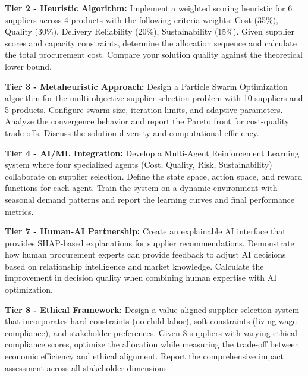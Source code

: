 \documentclass{article}
\begin{document}
\textbf{Tier 2 - Heuristic Algorithm:}
Implement a weighted scoring heuristic for 6 suppliers across 4 products with the following criteria weights: Cost (35\%), Quality (30\%), Delivery Reliability (20\%), Sustainability (15\%). Given supplier scores and capacity constraints, determine the allocation sequence and calculate the total procurement cost. Compare your solution quality against the theoretical lower bound.

\textbf{Tier 3 - Metaheuristic Approach:}
Design a Particle Swarm Optimization algorithm for the multi-objective supplier selection problem with 10 suppliers and 5 products. Configure swarm size, iteration limits, and adaptive parameters. Analyze the convergence behavior and report the Pareto front for cost-quality trade-offs. Discuss the solution diversity and computational efficiency.

\textbf{Tier 4 - AI/ML Integration:}
Develop a Multi-Agent Reinforcement Learning system where four specialized agents (Cost, Quality, Risk, Sustainability) collaborate on supplier selection. Define the state space, action space, and reward functions for each agent. Train the system on a dynamic environment with seasonal demand patterns and report the learning curves and final performance metrics.

\textbf{Tier 7 - Human-AI Partnership:}
Create an explainable AI interface that provides SHAP-based explanations for supplier recommendations. Demonstrate how human procurement experts can provide feedback to adjust AI decisions based on relationship intelligence and market knowledge. Calculate the improvement in decision quality when combining human expertise with AI optimization.

\textbf{Tier 8 - Ethical Framework:}
Design a value-aligned supplier selection system that incorporates hard constraints (no child labor), soft constraints (living wage compliance), and stakeholder preferences. Given 8 suppliers with varying ethical compliance scores, optimize the allocation while measuring the trade-off between economic efficiency and ethical alignment. Report the comprehensive impact assessment across all stakeholder dimensions.
\end{document}
